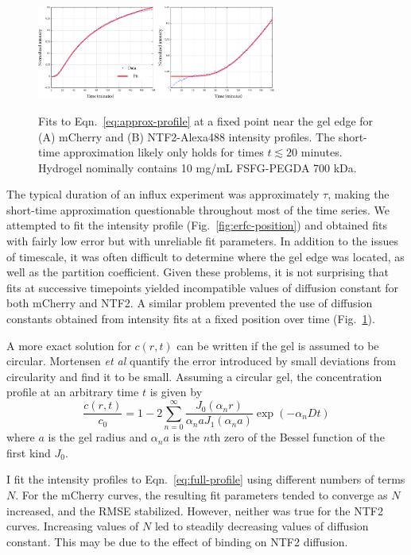 \begin{figure}
\caption{Fits to Eqn.~\ref{eq:approx-profile} at a fixed point near the gel edge for (A) mCherry and (B) NTF2-Alexa488 intensity profiles.  The short-time approximation likely only holds for times $t \lesssim 20$ minutes. Hydrogel nominally contains 10 mg/mL FSFG-PEGDA 700 kDa.\\}
\centering
\includegraphics[width=0.7\textwidth]{figs/ch04/erfc-time.pdf}
\label{fig:erfc-time}
\end{figure} 

The typical duration of an influx experiment was approximately $\tau$, making the short-time approximation questionable throughout most of the time series.  We attempted to fit the intensity profile (Fig.~\ref{fig:erfc-position}) and obtained fits with fairly low error but with unreliable fit parameters.  In addition to the issues of timescale, it was often difficult to determine where the gel edge was located, as well as the partition coefficient.  Given these problems, it is not surprising that fits at successive timepoints yielded incompatible values of diffusion constant for both mCherry and NTF2.  A similar problem prevented the use of diffusion constants obtained from intensity fits at a fixed position over time (Fig.~\ref{fig:erfc-time}).

A more exact solution for $c(r,t)$ can be written if the gel is assumed to be circular.  Mortensen \textit{et al} quantify the error introduced by small deviations from circularity and find it to be small.  Assuming a circular gel, the concentration profile at an arbitrary time $t$ is given by
\begin{equation}
\frac{c(r,t)}{c_0} = 1 - 2\sum_{n=0}^\infty \frac{J_0(\alpha_n r)}{\alpha_n a J_1(\alpha_n a)}\exp(-\alpha_n D t)
\label{eq:full-profile}
\end{equation}
where $a$ is the gel radius and $\alpha_n a$ is the $n$th zero of the Bessel function of the first kind $J_0$.

I fit the intensity profiles to Eqn.~\ref{eq:full-profile} using different numbers of terms $N$.  For the mCherry curves, the resulting fit parameters tended to converge as $N$ increased, and the RMSE stabilized.  However, neither was true for the NTF2 curves.  Increasing values of $N$ led to steadily decreasing values of diffusion constant.  This may be due to the effect of binding on NTF2 diffusion.

